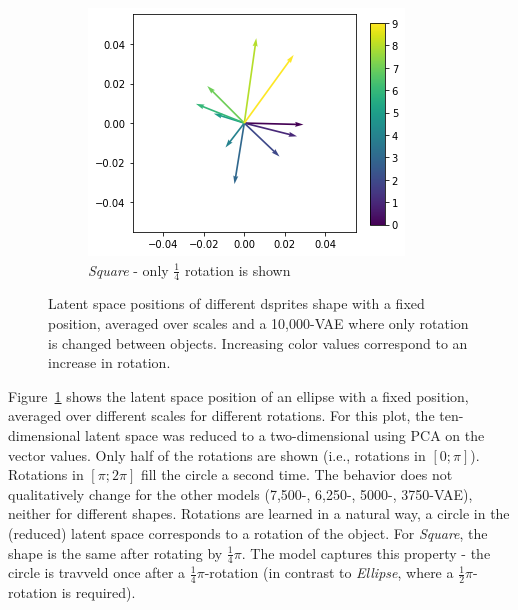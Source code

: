 \begin{figure}
    \hfill
    \begin{subfigure}{.3\textwidth}
        \includegraphics[width=\textwidth]{images/latent_space_traversals/vae_dsprites_orientation_latent_space_square.png}
        \caption{\textit{Square} - only $\frac{1}{4}$ rotation is shown}
    \end{subfigure}
    \caption[10,000-\ac{VAE} - Rotation latent space]{Latent space positions of different dsprites shape with a fixed position, averaged over scales and a 10,000-\ac{VAE} where only rotation is changed between objects. Increasing color values correspond to an increase in rotation. }
    \label{fig:vae_dsprites_rotation_latent_space_vae_10000}
\end{figure}

Figure~\ref{fig:vae_dsprites_rotation_latent_space_vae_10000} shows the latent space position of an ellipse with a fixed position, averaged over different scales for different rotations.
For this plot, the ten-dimensional latent space was reduced to a two-dimensional using \ac{PCA} on the vector values.
Only half of the rotations are shown (i.e., rotations in $[0;\pi]$).
Rotations in $[\pi; 2\pi]$ fill the circle a second time.
The behavior does not qualitatively change for the other models (7,500-, 6,250-, 5000-, 3750-\ac{VAE}), neither for different shapes.
Rotations are learned in a natural way, a circle in the (reduced) latent space corresponds to a rotation of the object.
For \textit{Square}, the shape is the same after rotating by $\frac{1}{4}\pi$.
The model captures this property - the circle is travveld once after a $\frac{1}{4}\pi$-rotation (in contrast to \textit{Ellipse}, where a $\frac{1}{2}\pi$-rotation is required).

